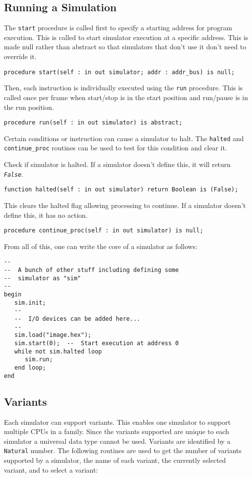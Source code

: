 \documentclass[10pt, openany]{book}
\newcommand{\function}[1]{\texttt{#1}}
\newcommand{\constant}[1]{\emph{\texttt{#1}}}
\newcommand{\datatype}[1]{\texttt{#1}}
\begin{document}
\subsection{Running a Simulation}
The \function{start} procedure is called first to specify a starting address for program execution.  This is called to start simulator execution at a specific address.  This is made null rather than abstract so that simulators that don't use it don't need to override it.
\begin{lstlisting}
procedure start(self : in out simulator; addr : addr_bus) is null;
\end{lstlisting}
Then, each instruction is individually executed using the \function{run} procedure.  This is called once per frame when start/stop is in the start position and run/pause is in the run position.
\begin{lstlisting}
procedure run(self : in out simulator) is abstract;
\end{lstlisting}
Certain conditions or instruction can cause a simulator to halt.  The \function{halted} and \function{continue\_proc} routines can be used to test for this condition and clear it.

Check if simulator is halted.  If a simulator doesn't define this, it will return \constant{False}.
\begin{lstlisting}
function halted(self : in out simulator) return Boolean is (False);
\end{lstlisting}
This clears the halted flag allowing processing to continue.  If a simulator doesn't define this, it has no action.
\begin{lstlisting}
procedure continue_proc(self : in out simulator) is null;
\end{lstlisting}
From all of this, one can write the core of a simulator as follows:
\begin{lstlisting}
--
--  A bunch of other stuff including defining some
--  simulator as "sim"
--
begin
   sim.init;
   --
   --  I/O devices can be added here...
   --
   sim.load("image.hex");
   sim.start(0);  --  Start execution at address 0
   while not sim.halted loop
      sim.run;
   end loop;
end
\end{lstlisting}

\subsection{Variants}
Each simulator can support variants.  This enables one simulator to support multiple CPUs in a family.  Since the variants supported are unique to each simulator a universal data type cannot be used.  Variants are identified by a \datatype{Natural} number.  The following routines are used to get the number of variants supported by a simulator, the name of each variant, the currently selected variant, and to select a variant:
\end{document}
